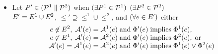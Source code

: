 \documentclass[t,aspectratio=169]{beamer} %
\begin{document}
\begin{frame}
\begin{itemize}[<+->]
    
  \item 
    Let $P' \in (\mathcal{P}^1 \parallel \mathcal{P}^2)$ when
    $(\exists P^1 \in \mathcal{P}^1)$ $(\exists P^2 \in \mathcal{P}^2)$
    \\%
    \qquad $E' = E^1 \cup E^2$,
    ${\le'}\supseteq{\le^1}\cup{\le^2}$, and $(\forall e\in E')$ either
    \begin{gather*}
      \begin{aligned}
        e \not\in E^2,\; \mathcal{A}'(e) &= \mathcal{A}^1(e) \;\allowbreak\text{and}\allowbreak\; \Phi'(e) \; \allowbreak\text{implies}\allowbreak\; \Phi^1(e),
        \\[-1ex]
        e \not\in E^1,\; \mathcal{A}'(e) &= \mathcal{A}^2(e) \;\allowbreak\text{and}\allowbreak\; \Phi'(e) \; \allowbreak\text{implies}\allowbreak\; \Phi^2(e),\; \allowbreak\text{or}\allowbreak\;
        \\[-1ex]
        \mathcal{A}'(e) = \mathcal{A}^1(e) &= \mathcal{A}^2(e) \;\allowbreak\text{and}\allowbreak\; \Phi'(e) \; \allowbreak\text{implies}\allowbreak\; \Phi^1(e) \lor \Phi^2(e)
      \end{aligned}
    \end{gather*}
  \end{itemize}
\end{frame}
\end{document}
